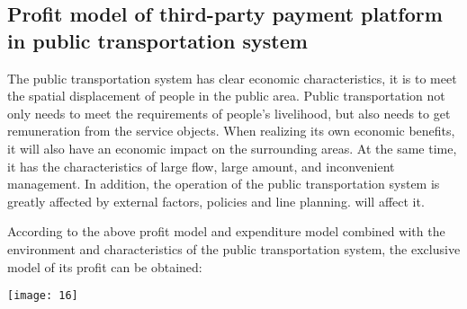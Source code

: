 \documentclass[../mcmpaper]{subfiles}
\begin{document}
\subsection{Profit model of third-party payment platform in public transportation system}
The public transportation system has clear economic characteristics, it is to meet the spatial displacement of people in the public area. Public transportation not only needs to meet the requirements of people's livelihood, but also needs to get remuneration from the service objects. When realizing its own economic benefits, it will also have an economic impact on the surrounding areas. At the same time, it has the characteristics of large flow, large amount, and inconvenient management. In addition, the operation of the public transportation system is greatly affected by external factors, policies and line planning.
will affect it.
\par
According to the above profit model and expenditure model combined with the environment and characteristics of the public transportation system, the exclusive model of its profit can be obtained:\\
\begin{minipage}{1.0\linewidth}
\centering
\texttt{[image: 16]}
\label{fig:5.12}
\end{minipage}
\end{document}
